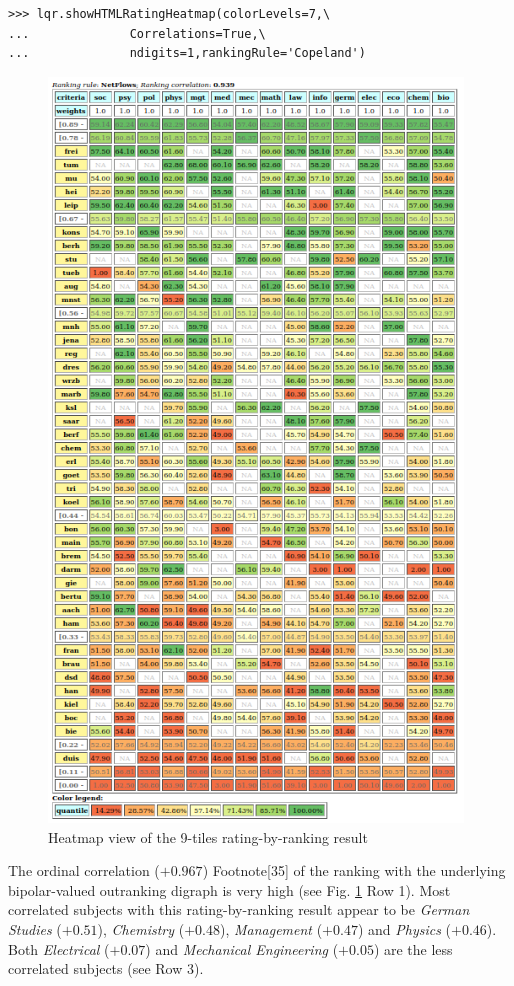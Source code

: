 \begin{lstlisting}
>>> lqr.showHTMLRatingHeatmap(colorLevels=7,\
...              Correlations=True,\
...              ndigits=1,rankingRule='Copeland')
\end{lstlisting}

\begin{figure}[h]
\includegraphics[width=11cm]{Figures/nineTilingResult.png}
\caption{Heatmap view of the 9-tiles rating-by-ranking result}
\label{fig:14.4}       %
\end{figure}
The ordinal correlation ($+0.967$) Footnote[35] of the \Copeland ranking with the underlying bipolar-valued outranking digraph is very high (see Fig. \ref{fig:14.4} Row 1). Most correlated subjects with this rating-by-ranking result appear to be \emph{German Studies} ($+0.51$), \emph{Chemistry} ($+0.48$), \emph{Management} ($+0.47$) and \emph{Physics} ($+0.46$). Both \emph{Electrical} ($+0.07$) and \emph{Mechanical Engineering} ($+0.05$) are the less correlated subjects (see Row 3).

